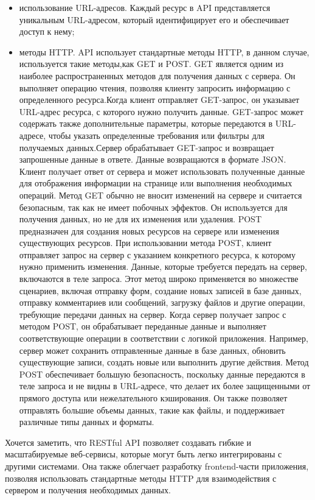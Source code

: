 \begin{itemize}
    \item использование URL-адресов. Каждый ресурс в API представляется уникальным URL-адресом, который идентифицирует его и обеспечивает доступ к нему;
    \item методы HTTP. API использует стандартные методы HTTP, в данном случае, используется такие методы,как GET и POST. 
    GET является одним из наиболее распространенных методов для получения данных с сервера. Он выполняет операцию чтения, позволяя клиенту запросить информацию с определенного ресурса.Когда клиент отправляет GET-запрос, он указывает URL-адрес ресурса, с которого нужно получить данные. GET-запрос может содержать также дополнительные параметры, которые передаются в URL-адресе, чтобы указать определенные требования или фильтры для получаемых данных.Сервер обрабатывает GET-запрос и возвращает запрошенные данные в ответе. Данные возвращаются в формате JSON. Клиент получает ответ от сервера и может использовать полученные данные для отображения информации на странице или выполнения необходимых операций. Метод GET обычно не вносит изменений на сервере и считается безопасным, так как не имеет побочных эффектов. Он используется для получения данных, но не для их изменения или удаления.
    POST предназначен для создания новых ресурсов на сервере или изменения существующих ресурсов. При использовании метода POST, клиент отправляет запрос на сервер с указанием конкретного ресурса, к которому нужно применить изменения. Данные, которые требуется передать на сервер, включаются в теле запроса.
    Этот метод широко применяется во множестве сценариев, включая отправку форм, создание новых записей в базе данных, отправку комментариев или сообщений, загрузку файлов и другие операции, требующие передачи данных на сервер.
    Когда сервер получает запрос с методом POST, он обрабатывает переданные данные и выполняет соответствующие операции в соответствии с логикой приложения. Например, сервер может сохранить отправленные данные в базе данных, обновить существующие записи, создать новые или выполнить другие действия.
    Метод POST обеспечивает большую безопасность, поскольку данные передаются в теле запроса и не видны в URL-адресе, что делает их более защищенными от прямого доступа или нежелательного кэширования. Он также позволяет отправлять большие объемы данных, такие как файлы, и поддерживает различные типы данных и форматы.
\end{itemize}

Хочется заметить, что RESTful API позволяет создавать гибкие и масштабируемые веб-сервисы, которые могут быть легко интегрированы с другими системами. Она также облегчает разработку frontend-части приложения, позволяя использовать стандартные методы HTTP для взаимодействия с сервером и получения необходимых данных.

